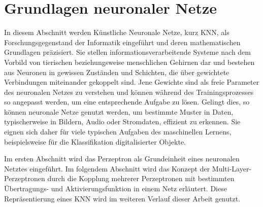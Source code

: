 \chapter{Grundlagen neuronaler Netze}
\label{kapitel_neuralnetworks}

In diesem Abschnitt werden Künstliche Neuronale Netze\cite{dayhoff1990neural}, kurz KNN, als Forschungsgegenstand der Informatik eingeführt und deren mathematischen Grundlagen präzisiert. 
Sie stellen informationsverarbeitende Systeme nach dem Vorbild von tierischen beziehungsweise menschlichen Gehirnen dar und bestehen aus Neuronen in gewissen Zuständen und Schichten, die über gewichtete Verbindungen miteinander gekoppelt sind. Jene Gewichte sind als freie Parameter des neuronalen Netzes zu verstehen und können während des Trainingsprozesses so angepasst werden, um eine entsprechende Aufgabe zu lösen.  
Gelingt dies, so können neuronale Netze genutzt werden, um bestimmte Muster in Daten, typischerweise in Bildern, Audio oder Stromdaten, effizient zu erkennen\cite{pandya1995pattern, pao1989adaptive, urbaniak2021quality}.
Sie eignen sich daher für viele typischen Aufgaben des maschinellen Lernens, beispielsweise für die Klassifikation digitalisierter Objekte.

Im ersten Abschnitt wird das Perzeptron\cite{rosenblatt1958perceptron} als Grundeinheit eines neuronalen Netztes eingeführt. 
Im folgendem Abschnitt wird das Konzept der Multi-Layer-Perzeptronen\cite{werbos1988generalization} durch die Kopplung mehrerer Perzeptronen mit bestimmten Übertragungs- und Aktivierungsfunktion in einem Netz erläutert. Diese Repräsentierung eines KNN wird im weiteren Verlauf dieser Arbeit genutzt. 


